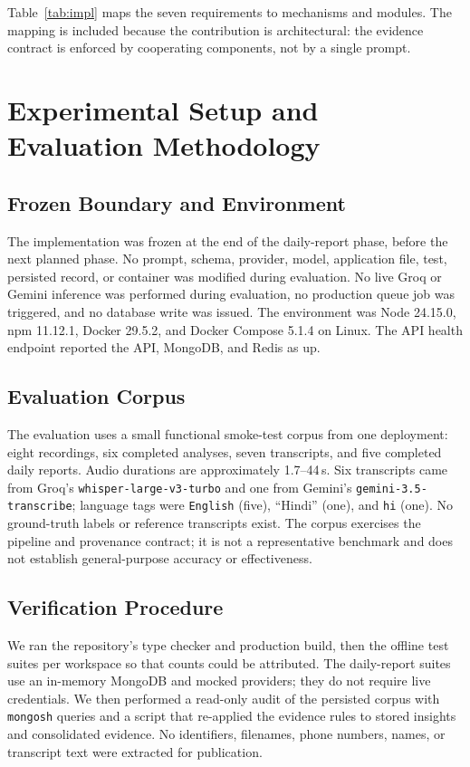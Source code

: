 \documentclass[conference,a4paper]{IEEEtran}
\newcommand{\code}[1]{\texttt{#1}}
\begin{document}
Table~\ref{tab:impl} maps the seven requirements to mechanisms and modules. The mapping is
included because the contribution is architectural: the evidence contract is enforced by
cooperating components, not by a single prompt.

\section{Experimental Setup and Evaluation Methodology}

\subsection{Frozen Boundary and Environment}

The implementation was frozen at the end of the daily-report phase, before the next planned
phase. No prompt, schema, provider, model, application file, test, persisted record, or
container was modified during evaluation. No live Groq or Gemini inference was performed during
evaluation, no production queue job was triggered, and no database write was issued. The environment
was Node 24.15.0, npm 11.12.1, Docker 29.5.2, and Docker Compose 5.1.4 on Linux. The API
health endpoint reported the API, MongoDB, and Redis as up.

\subsection{Evaluation Corpus}

The evaluation uses a small functional smoke-test corpus from one deployment: eight
recordings, six completed analyses, seven transcripts, and five completed daily reports.
Audio durations are approximately 1.7--44\,s. Six transcripts came from Groq's
\code{whisper-large-v3-turbo} and one from Gemini's \code{gemini-3.5-transcribe}; language
tags were \code{English} (five), ``Hindi'' (one), and \code{hi} (one). No ground-truth
labels or reference transcripts exist. The corpus exercises the pipeline and provenance
contract; it is not a representative benchmark and does not establish general-purpose
accuracy or effectiveness.

\subsection{Verification Procedure}

We ran the repository's type checker and production build, then the offline test suites per
workspace so that counts could be attributed. The daily-report suites use an in-memory
MongoDB and mocked providers; they do not require live credentials. We then performed a
read-only audit of the persisted corpus with \code{mongosh} queries and a script that
re-applied the evidence rules to stored insights and consolidated evidence. No identifiers,
filenames, phone numbers, names, or transcript text were extracted for publication.
\end{document}
